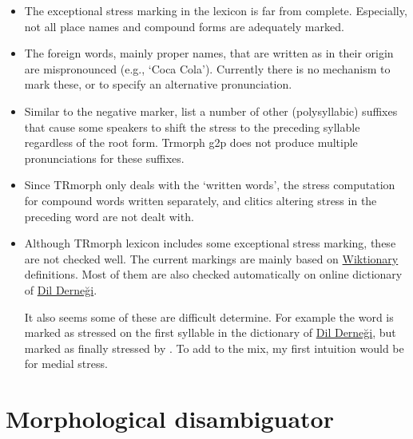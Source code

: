 \documentclass[twocolumn]{article}
\begin{document}
\begin{itemize}
    \item The exceptional stress marking in the lexicon is far from complete.
        Especially, not all place names and compound forms are adequately marked.
    \item The foreign words, mainly proper names,  
        that are written as in their origin are mispronounced
        (e.g., `Coca Cola').
        Currently there is no mechanism to mark these, 
        or to specify an alternative pronunciation. 
    \item Similar to the negative marker, 
        \textcite[p.30]{goksel2005} list a number of other (polysyllabic) suffixes that cause some speakers to shift the stress to the preceding syllable regardless of the root form.
        Trmorph g2p does not produce multiple pronunciations for these suffixes.
    \item Since TRmorph only deals with the `written words', 
        the stress computation for compound words written separately,
        and clitics altering stress in the preceding word are not dealt with.
    \item Although TRmorph lexicon includes some exceptional stress marking,
        these are not checked well.
        The current markings are mainly based on \href{http://en.wiktionary.org/wiki/Wiktionary:Main_Page}{Wiktionary} definitions.
        Most of them are also checked automatically on  online dictionary of \href{http://en.wiktionary.org/wiki/Wiktionary:Main_Page}{Dil Derneği}.

        It also seems some of these are difficult determine.
        For example the word  is marked as stressed on the first syllable in the dictionary of \href{http://www.dildernegi.org.tr/}{Dil Derneği}, 
        but marked as finally stressed by \textcite{ergenc2002}.
        To add to the mix, my first intuition would be for medial stress.
\end{itemize}



\section{\label{sec:disambiguation}Morphological disambiguator}
\end{document}
